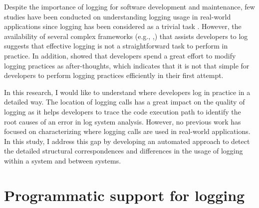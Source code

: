 Despite the importance of logging for software development and maintenance, few studies have been conducted on understanding logging usage in real-world applications since logging has been considered as a trivial task \cite{clarke1999dimension,clarke1999subject}. However, the availability of several complex frameworks (e.g., ,) that assists developers to log suggests that effective logging is not a straightforward task to perform in practice. In addition, \citet{yuan2012characterizing} showed that developers spend a great effort to modify logging practices as after-thoughts, which indicates that it is not that simple for developers to perform logging practices efficiently in their first attempt.

In this research, I would like to understand where developers log in practice in a detailed way. The location of logging calls has a great impact on the quality of logging as it helps developers to trace the code execution path to identify the root causes of an error in log system analysis. However, no previous work has focused on characterizing where logging calls are used in real-world applications.
In this study, I address this gap by developing an automated approach to detect the detailed structural correspondences and differences in the usage of logging within a system and between systems.




\section{Programmatic support for logging} \label{background Logging}

